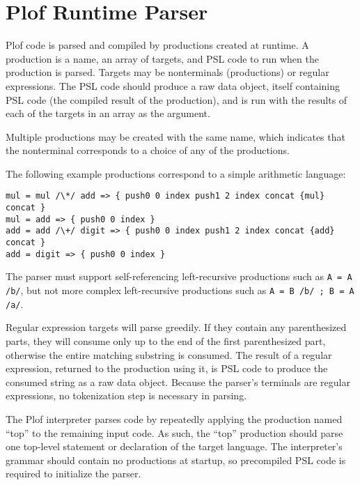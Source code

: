 \chapter{Plof Runtime Parser}

Plof code is parsed and compiled by productions created at runtime. A production is a name, an array of targets, and PSL code to run when the production is parsed. Targets may be nonterminals (productions) or regular expressions. The PSL code should produce a raw data object, itself containing PSL code (the compiled result of the production), and is run with the results of each of the targets in an array as the argument.

Multiple productions may be created with the same name, which indicates that the nonterminal corresponds to a choice of any of the productions.

The following example productions correspond to a simple arithmetic language:

\begin{verbatim}
mul = mul /\*/ add => { push0 0 index push1 2 index concat {mul} concat }
mul = add => { push0 0 index }
add = add /\+/ digit => { push0 0 index push1 2 index concat {add} concat }
add = digit => { push0 0 index }
\end{verbatim}

The parser must support self-referencing left-recursive productions such as \texttt{A = A /b/}, but not more complex left-recursive productions such as \texttt{A = B /b/ ; B = A /a/}.

Regular expression targets will parse greedily. If they contain any parenthesized parts, they will consume only up to the end of the first parenthesized part, otherwise the entire matching substring is consumed. The result of a regular expression, returned to the production using it, is PSL code to produce the consumed string as a raw data object. Because the parser's terminals are regular expressions, no tokenization step is necessary in parsing.

The Plof interpreter parses code by repeatedly applying the production named ``top'' to the remaining input code. As such, the ``top'' production should parse one top-level statement or declaration of the target language. The interpreter's grammar should contain no productions at startup, so precompiled PSL code is required to initialize the parser.

